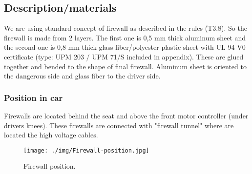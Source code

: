 \subsection{Description/materials}

We are using standard concept of firewall as described in the rules (T3.8). So the firewall is made from 2 layers. The first one is 0,5 mm thick aluminum sheet and the second one is 0,8 mm thick glass fiber/polyester plastic sheet with UL 94-V0 certificate (type: UPM 203 / UPM 71/S included in appendix). These are glued together and bended to the shape of final firewall. Aluminum sheet is oriented to the dangerous side and glass fiber to the driver side.

\subsubsection{Position in car}

Firewalls are located behind the seat and above the front motor controller (under drivers knees). These firewalls are connected with "firewall tunnel" where are located the high voltage cables.

\begin{figure}[H]
	\centering
	\texttt{[image: ./img/Firewall-position.jpg]}
	\caption{Firewall position.}
	\label{fig:Firewall-position}
\end{figure}